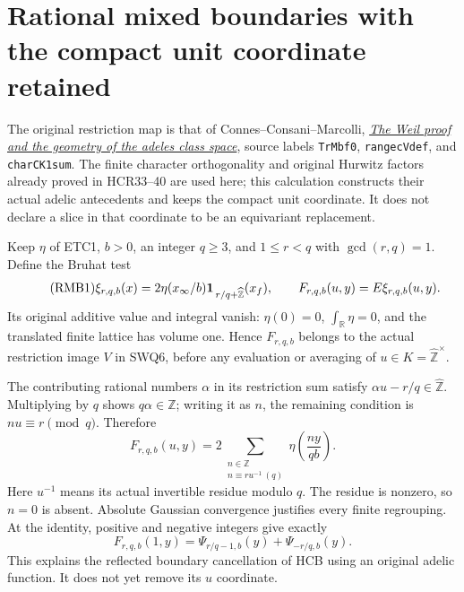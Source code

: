 \section{Rational mixed boundaries with the compact unit coordinate retained}
\label{sec:cc-rational-mixed-boundary}

The original restriction map is that of Connes--Consani--Marcolli,
\href{https://arxiv.org/abs/math/0703392v1}{\emph{The Weil proof and
the geometry of the adeles class space}}, source labels
\texttt{TrMbf0}, \texttt{rangecVdef}, and
\texttt{charCK1sum}. The finite character orthogonality and original
Hurwitz factors already proved in HCR33--40 are used here; this
calculation constructs their actual adelic antecedents and keeps
the compact unit coordinate. It does not declare a slice in that
coordinate to be an equivariant replacement.

Keep $\eta$ of ETC1, $b>0$, an integer $q\ge3$, and
$1\le r<q$ with $\gcd(r,q)=1$. Define the Bruhat test
\begin{equation}\tag{RMB1}
 \xi_{r,q,b}(x)=2\eta(x_\infty/b)
                    {\bf1}_{\,r/q+\widehat{\mathbb Z}}(x_f),
 \qquad F_{r,q,b}(u,y)=E\xi_{r,q,b}(u,y).
\end{equation}
Its original additive value and integral vanish:
$\eta(0)=0$, $\int_{\mathbb R}\eta=0$, and the translated
finite lattice has volume one. Hence $F_{r,q,b}$ belongs
to the actual restriction image $V$ in SWQ6, before any
evaluation or averaging of $u\in K=\widehat{\mathbb Z}^{\times}$.

The contributing rational numbers $\alpha$ in its restriction
sum satisfy $\alpha u-r/q\in\widehat{\mathbb Z}$.
Multiplying by $q$ shows $q\alpha\in\mathbb Z$; writing it
as $n$, the remaining condition is $nu\equiv r\pmod q$.
Therefore
\begin{equation}\tag{RMB2}
 F_{r,q,b}(u,y)
   =2\sum_{\substack{n\in\mathbb Z\\n\equiv ru^{-1}\ (q)}}
                \eta\!\left(\frac{ny}{qb}\right).
\end{equation}
Here $u^{-1}$ means its actual invertible residue modulo $q$.
The residue is nonzero, so $n=0$ is absent. Absolute Gaussian
convergence justifies every finite regrouping. At the identity,
positive and negative integers give exactly
\begin{equation}\tag{RMB3}
 F_{r,q,b}(1,y)=
   \Psi_{r/q-1,b}(y)+\Psi_{-r/q,b}(y).
\end{equation}
This explains the reflected boundary cancellation of HCB using
an original adelic function. It does not yet remove its $u$ coordinate.

